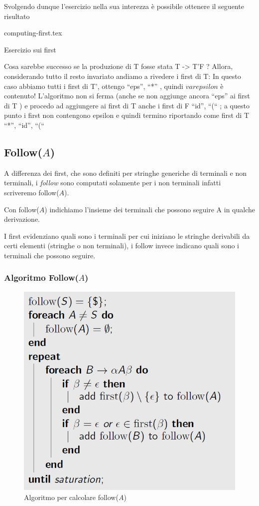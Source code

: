 \documentclass[class=book, crop=false, oneside, 12pt]{standalone}
\begin{document}
Svolgendo dunque l'esercizio nella sua interezza è possibile ottenere il seguente risultato

\begin{table}[H]
	\centering
	{computing-first.tex}
    \caption{Esercizio sui first}
    \label{computing-first}
\end{table}

Cosa sarebbe successo se la produzione di T fosse stata T -> T’F ?
Allora, considerando tutto il resto invariato andiamo a rivedere i first di T:
In questo caso abbiamo tutti i first di T’, ottengo { “eps”, “*” }, quindi \(varepsilon\) è contenuto! L’algoritmo non si ferma (anche se non aggiunge ancora “eps” ai first di T ) e procedo ad aggiungere ai first di T anche i first di F { “id”, “(“ }; a questo punto i first non contengono epsilon e quindi termino riportando come first di T { “*”, “id”, “(“ }


\subsection{Follow(\(A\))}

A differenza dei first, che sono definiti per stringhe generiche di terminali e non terminali, i \emph{follow} sono computati solamente per i non terminali infatti scriveremo follow(\(A\)).

Con follow(\(A\)) indichiamo l'insieme dei terminali che possono seguire A in qualche derivazione.

I first evidenziano quali sono i terminali per cui iniziano le stringhe derivabili da certi elementi (stringhe o non terminali), i follow invece indicano quali sono i terminali che possono seguire.

\subsubsection{Algoritmo Follow(\(A\))}

\begin{figure}[H]
    \centering
    \includegraphics[width=.7\textwidth,keepaspectratio]{follow-algorithm.png}
    \caption{Algoritmo per calcolare follow(\(A\))}
    \label{follow-algorithm}
\end{figure}
\end{document}
